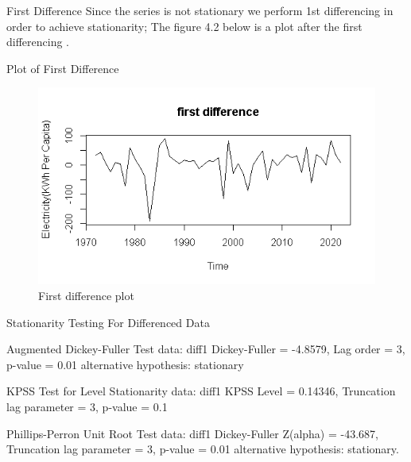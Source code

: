 \documentclass{beamer}
\begin{document}
	\begin{frame}
		\begin{alertblock}{First Difference}
			\vspace{5pt}
			Since the series is not stationary we perform 1st differencing in order to achieve stationarity;
			The figure 4.2 below is a plot after the first differencing .
			\vspace{5pt}
		\end{alertblock}
	\end{frame}

	\begin{frame}{Plot of First Difference}
		\begin{figure}
			\begin{center}
				\includegraphics[width=0.9\linewidth]{images/image2}
			\end{center}
		
			\caption{First difference plot}
		\end{figure}

	\end{frame}

	\begin{frame}{Stationarity Testing For Differenced Data}
		\begin{block}{Augmented Dickey-Fuller Test}
			data: diff1 Dickey-Fuller = -4.8579, Lag order = 3, p-value = 0.01 alternative hypothesis: stationary \vspace{5pt}
		\end{block}
		
		\begin{alertblock}{KPSS Test for Level Stationarity}
			data: diff1 KPSS Level = 0.14346, Truncation lag parameter = 3, p-value = 0.1 \vspace{5pt}
		\end{alertblock}
		
		\begin{exampleblock}{Phillips-Perron Unit Root Test}
			data: diff1 Dickey-Fuller Z(alpha) = -43.687, Truncation lag parameter = 3, p-value = 0.01 alternative hypothesis: stationary.
		\end{exampleblock}
	\end{frame}
	
\end{document}
